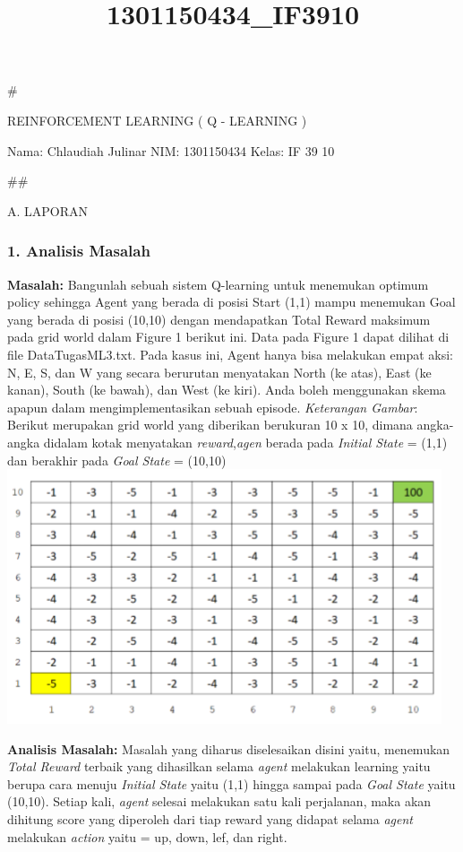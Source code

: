 \documentclass[11pt]{article}
\title{1301150434\_IF3910}
\makeatletter
\def\maxwidth{\ifdim\Gin@nat@width>\linewidth\linewidth
    \else\Gin@nat@width\fi}
\let\Oldincludegraphics\includegraphics
\renewcommand{\includegraphics}[1]{\Oldincludegraphics[width=.8\maxwidth]{#1}}
\makeatother
\begin{document}
    
    
    \maketitle
    
    

    
    \#

REINFORCEMENT LEARNING ( Q - LEARNING )

Nama: Chlaudiah Julinar NIM: 1301150434 Kelas: IF 39 10

    \#\#

A. LAPORAN

    \subsubsection{1. Analisis Masalah}\label{analisis-masalah}

\textbf{Masalah:} Bangunlah sebuah sistem Q-learning untuk menemukan
optimum policy sehingga Agent yang berada di posisi Start (1,1) mampu
menemukan Goal yang berada di posisi (10,10) dengan mendapatkan Total
Reward maksimum pada grid world dalam Figure 1 berikut ini. Data pada
Figure 1 dapat dilihat di ﬁle DataTugasML3.txt. Pada kasus ini, Agent
hanya bisa melakukan empat aksi: N, E, S, dan W yang secara berurutan
menyatakan North (ke atas), East (ke kanan), South (ke bawah), dan West
(ke kiri). Anda boleh menggunakan skema apapun dalam mengimplementasikan
sebuah episode. \emph{Keterangan Gambar}: Berikut merupakan grid world
yang diberikan berukuran 10 x 10, dimana angka-angka didalam kotak
menyatakan \emph{reward},\emph{agen} berada pada \emph{Initial State} =
(1,1) dan berakhir pada \emph{Goal State} = (10,10)
\includegraphics{Grid World.PNG}

    \textbf{Analisis Masalah:} Masalah yang diharus diselesaikan disini
yaitu, menemukan \emph{Total Reward} terbaik yang dihasilkan selama
\emph{agent} melakukan learning yaitu berupa cara menuju \emph{Initial
State} yaitu (1,1) hingga sampai pada \emph{Goal State} yaitu (10,10).
Setiap kali, \emph{agent} selesai melakukan satu kali perjalanan, maka
akan dihitung score yang diperoleh dari tiap reward yang didapat selama
\emph{agent} melakukan \emph{action} yaitu = up, down, lef, dan right.
\end{document}
